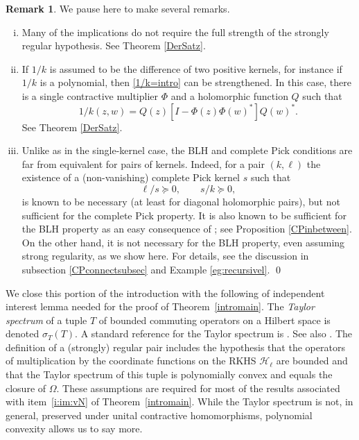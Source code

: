 \documentclass[a4paper,reqno,index]{amsart}
\newcommand{\df}[1]{{\textit{#1}}{\index{#1}}}
\numberwithin{equation}{section}
\newcommand{\cH}{\mathcal{H}}
\newcommand{\specT}{\sigma_T}  %
\theoremstyle{definition}
\newtheorem{remark}[theorem]{Remark}
\begin{document}
\begin{remark}\rm
 \label{r:more}
 We pause here to make several remarks.
 \begin{enumerate}[(i)]\itemsep=6pt


\item 
 Many of the implications do not require the full strength of the strongly
regular hypothesis. See Theorem \ref{DerSatz}.
 

 

 

\item If $1/k$ is assumed to be the difference of two positive kernels, for instance if $1/k$ is a polynomial, then \eqref{1/k=intro} can be strengthened.
In this case, there is a single contractive multiplier $\Phi$ and a holomorphic function $Q$ such that \[1/k(z,w)=Q(z)[I-\Phi(z)\Phi(w)^*]Q(w)^*.\] See Theorem \ref{DerSatz}.


\item   Unlike as in the single-kernel case,  the BLH and complete Pick conditions are far from equivalent for pairs of kernels. Indeed, for a pair $(k, \ell)$ the existence of a (non-vanishing) complete Pick kernel $s$ such that 
\begin{equation}%
\ell/s\succeq0, \qquad s/k\succeq0,
\end{equation}
is  known to be necessary \cite[Theorem 1.4]{mcctsik}
 (at least for diagonal holomorphic pairs), but not sufficient \cite[Proposition 7.4]{mcctsik} for the complete Pick property.  It is also known to be sufficient for the BLH property 
as an easy consequence of \cite[Lemma 2.2]{Beurlingfactor}; see Proposition \ref{CPinbetween}.  On the other hand, it is not necessary for the BLH property, even assuming strong regularity,
as we show here. For details, see the discussion in subsection \ref{CPconnectsubsec} and Example \ref{eg:recursivel}. \qed
 \end{enumerate}
 \end{remark}



We close this portion of the introduction with the following of independent interest lemma needed for the proof  of Theorem~\ref{intromain}.  The    \df{Taylor spectrum} of a tuple  $T$ of bounded commuting operators on a Hilbert space
  is denoted \df{$\specT(T)$}. A standard reference for the Taylor spectrum is \cite{mullerbook}. See also \cite{Curtosurveyref}. 
The definition of a (strongly) regular pair includes the hypothesis
that the operators of multiplication by the coordinate functions on 
the RKHS $\cH_\ell$ are bounded and that 
the Taylor spectrum of this tuple is polynomially convex and equals
the closure of $\Omega.$ These assumptions are required for most of the results
associated with item~\ref{i:im:vN} of Theorem~\ref{intromain}.
While the Taylor spectrum is not, in general, preserved under unital contractive homomorphisms, polynomial convexity allows us to say more.  
\end{document}
